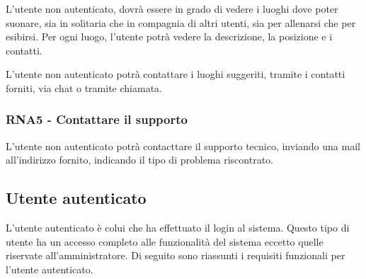 \documentclass[12pt, a4paper]{article}
\begin{document}
L'utente non autenticato, dovrà essere in grado di vedere i luoghi dove poter suonare, sia in solitaria che in compagnia di altri utenti, sia per allenarsi che per esibirsi. Per ogni luogo, l'utente potrà vedere la descrizione, la posizione e i contatti.

L'utente non autenticato potrà contattare i luoghi suggeriti, tramite i contatti forniti, via chat o tramite chiamata.

\subsubsection*{\hypertarget{RNA5}{RNA5 - Contattare il supporto}}

L'utente non autenticato potrà contacttare il supporto tecnico, inviando una mail all'indirizzo fornito, indicando il tipo di problema riscontrato.


\newpage
\subsection{Utente autenticato}

L'utente autenticato è colui che ha effettuato il login al sistema. Questo tipo di utente ha un accesso completo alle funzionalità del sistema eccetto quelle riservate all'amministratore. Di seguito sono riassunti i requisiti funzionali per l'utente autenticato.
\end{document}
